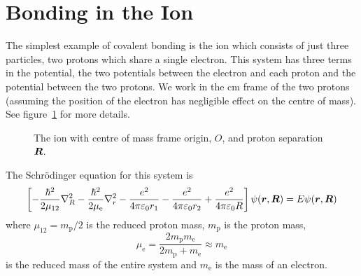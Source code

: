 \documentclass[a4paper]{article}
\newcommand{\Pe}{\mathrm{e}}
\newcommand{\Pp}{\mathrm{p}}
\begin{document}
    \section{Bonding in the \texorpdfstring{}{H2+} Ion}
    The simplest example of covalent bonding is the  ion which consists of just three particles, two protons which share a single electron.
    This system has three terms in the potential, the two potentials between the electron and each proton and the potential between the two protons.
    We work in the \gls{cm} frame of the two protons (assuming the position of the electron has negligible effect on the centre of mass).
    See figure~\ref{fig:H2+ ion} for more details.
    \begin{figure}[ht]
        \centering
        \caption{The  ion with centre of mass frame origin, \(O\), and proton separation \(\bm{R}\).}
        \label{fig:H2+ ion}
    \end{figure}
    
    The Schr\"odinger equation for this system is
    \[\left[ -\frac{\hbar^2}{2\mu_{12}}\grad_R^2 - \frac{\hbar^2}{2\mu_{\Pe}}\grad_r^2 - \frac{e^2}{4\pi\varepsilon_0r_1} - \frac{e^2}{4\pi\varepsilon_0r_2} + \frac{e^2}{4\pi\varepsilon_0R} \right] \psi(\vv{r}, \vv{R}) = E\psi(\vv{r}, \vv{R})\]
    where \(\mu_{12} = m_{\Pp}/2\) is the reduced proton mass, \(m_{\Pp}\) is the proton mass,
    \[\mu_{\Pe} = \frac{2m_{\Pp}m_{\Pe}}{2m_{\Pp} + m_{\Pe}} \approx m_{\Pe}\]
    is the reduced mass of the entire system and \(m_{\Pe}\) is the mass of an electron.
    
\end{document}
